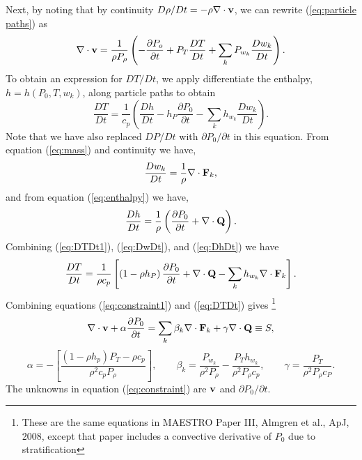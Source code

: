 \documentclass[final]{siamltex}
\def\Fb {{\bf F}}
\def\Qb {{\bf Q}}
\def\vb {{\bf v}}
\begin{document}
Next, by noting that by continuity $D\rho/Dt = -\rho\nabla\cdot\vb$, we can rewrite 
(\ref{eq:particle paths}) as
\begin{equation}
\nabla\cdot\vb = \frac{1}{\rho P_\rho}\left(-\frac{\partial P_o}{\partial t} + P_T\frac{DT}{Dt} + \sum_kP_{w_k}\frac{Dw_k}{Dt}\right).\label{eq:constraint1}
\end{equation}
To obtain an expression for $DT/Dt$, we apply differentiate the enthalpy, $h=h(P_0,T,w_k)$, 
along particle paths to obtain
\begin{equation}
\frac{DT}{Dt} = \frac{1}{c_p}\left(\frac{Dh}{Dt} - h_P\frac{\partial P_0}{\partial t} - \sum_kh_{w_k}\frac{Dw_k}{Dt}\right).\label{eq:DTDt1}
\end{equation}
Note that we have also replaced $DP/Dt$ with 
$\partial P_0/\partial t$ in this equation.  From equation (\ref{eq:mass}) and 
continuity we have,
\begin{equation}
\frac{Dw_k}{Dt} = \frac{1}{\rho}\nabla\cdot\Fb_k,\label{eq:DwDt}
\end{equation}
and from equation (\ref{eq:enthalpy}) we have,
\begin{equation}
\frac{Dh}{Dt} = \frac{1}{\rho}\left(\frac{\partial P_0}{\partial t} + \nabla\cdot\Qb\right).\label{eq:DhDt}
\end{equation}
Combining (\ref{eq:DTDt1}), (\ref{eq:DwDt}), and (\ref{eq:DhDt}) we have
\begin{equation}
\frac{DT}{Dt} = \frac{1}{\rho c_p}\left[\left(1 - \rho h_P\right)\frac{\partial P_0}{\partial t} + \nabla\cdot\Qb - \sum_kh_{w_k}\nabla\cdot\Fb_k\right].\label{eq:DTDt}
\end{equation}
Combining equations (\ref{eq:constraint1}) and (\ref{eq:DTDt}) gives
\footnote{These are the same equations in MAESTRO Paper III, Almgren et al., ApJ, 2008, except that paper includes a convective derivative of $P_0$ due to stratification}
\begin{equation}
\nabla\cdot\vb + \alpha\frac{\partial P_0}{\partial t} = \sum_k \beta_k \nabla\cdot\Fb_k + \gamma \nabla\cdot\Qb \equiv S,\label{eq:constraint}
\end{equation}
\begin{equation}
\alpha = -\left[\frac{(1-\rho h_p)P_T - \rho c_p}{\rho^2 c_p P_\rho}\right], \qquad
\beta_k = \frac{P_{w_k}}{\rho^2 P_\rho} - \frac{P_T h_{w_k}}{\rho^2 P_\rho c_p}, \qquad
\gamma = \frac{P_T}{\rho^2 P_\rho c_P}.
\end{equation}
The unknowns in equation (\ref{eq:constraint}) are $\vb$ and $\partial P_0/\partial t$.
\end{document}

